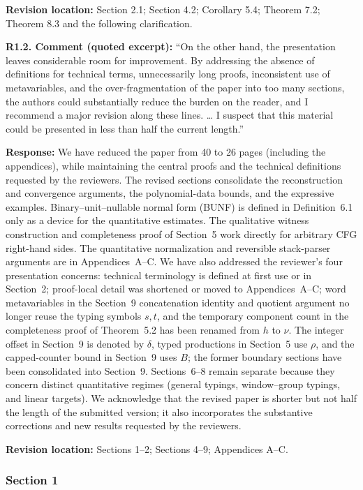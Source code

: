 \documentclass[
  10pt,
  a4paper,
]{article}
\begin{document}
\textbf{Revision location:} Section 2.1; Section 4.2; Corollary 5.4; Theorem 7.2; Theorem 8.3 and the following clarification.


\textbf{R1.2. Comment (quoted excerpt):} ``On the other hand, the presentation leaves
considerable room for improvement. By addressing the absence of definitions for
technical terms, unnecessarily long proofs, inconsistent use of metavariables, and
the over-fragmentation of the paper into too many sections, the authors could
substantially reduce the burden on the reader, and I recommend a major revision
along these lines. \ldots{} I suspect that this material could be presented in less
than half the current length.''

\textbf{Response:} We have reduced the paper from 40 to 26 pages
(including the appendices), while maintaining the central proofs and
the technical definitions requested by the reviewers. The revised
sections consolidate the reconstruction and convergence arguments,
the polynomial-data bounds, and the expressive examples. Binary--unit--nullable normal form (BUNF) is defined in
Definition~6.1 only as a device for the quantitative estimates.
The qualitative witness construction and completeness proof
of Section~5 work directly for arbitrary CFG right-hand sides.
The quantitative normalization and reversible
stack-parser arguments are in Appendices~A--C.
We have also addressed the reviewer's four presentation concerns:
technical terminology is defined at first use or in Section~2;
proof-local detail was shortened or moved to Appendices~A--C;
word metavariables in the Section~9 concatenation identity and
quotient argument no longer reuse the typing symbols $s,t$,
and the temporary component count in the completeness proof
of Theorem~5.2 has been renamed from $h$ to $\nu$.
The integer offset in Section~9 is denoted by $\delta$,
typed productions in Section~5 use $\rho$, and the capped-counter
bound in Section~9 uses $B$;
the former boundary sections have been consolidated into
Section~9. Sections~6--8 remain separate because they concern
distinct quantitative regimes (general typings, window--group
typings, and linear targets). We acknowledge that the revised
paper is shorter but not half the length of the submitted version;
it also incorporates the substantive corrections and new
results requested by the reviewers.

\textbf{Revision location:} Sections 1--2; Sections 4--9; Appendices A--C.


\subsubsection{Section 1}\label{section-1}
\end{document}
